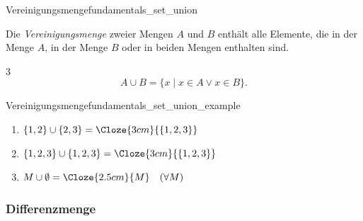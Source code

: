 \noindent\begin{minipage}{\linewidth}
\begin{DefinitionBox}{Vereinigungsmenge}{fundamentals_set_union}
  \begin{minipage}[c]{0.70\linewidth}
    Die \emph{Vereinigungsmenge}  zweier Mengen $A$ und
    $B$ enthält alle Elemente, die in der Menge $A$, in der Menge $B$ oder in
    beiden Mengen enthalten sind.
    \begin{ClozeArea}[24]{3}
      \[
        A\cup B=\{x\mid x\in A\lor x\in B\}.
      \]
    \end{ClozeArea}
  \end{minipage}\hfill
  \begin{minipage}[c]{0.25\linewidth}
    \centering
  \end{minipage}
\end{DefinitionBox}

\begin{ExampleBox}{Vereinigungsmenge}{fundamentals_set_union_example}
  \begin{enumerate}[label=\alph*),itemsep=0.6em]
    \item $\{1,2\}\cup\{2,3\}=\Cloze{3cm}{\{1,2,3\}}$
    \item $\{1,2,3\}\cup\{1,2,3\}=\Cloze{3cm}{\{1,2,3\}}$
    \item $M\cup\emptyset=\Cloze{2.5cm}{M}\quad(\forall M)$
  \end{enumerate}
\end{ExampleBox}
\end{minipage}


\subsubsection{Differenzmenge}
\label{subsubsec:fundamentals_set_difference}

